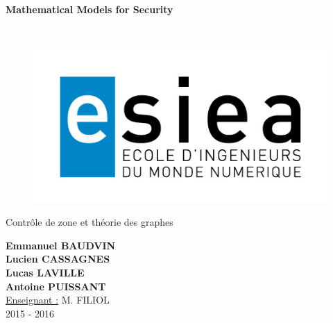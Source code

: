 \begin{titlepage}
      \begin{center}   
        \Huge
        \textbf{Mathematical Models for Security}
        
        \LARGE
        ~
        
        
        \vfill
        \begin{figure}[H]
	    \centering
	    \begin{minipage}{0.89\textwidth}
		\centering
		\includegraphics[width=\textwidth]{./img/esiea.jpeg}
	    \end{minipage}
	\end{figure}
        \vfill
        
        \vspace{0.5cm}
        
        Contrôle de zone et théorie des graphes
        
        \vspace{2cm}
        \textbf{Emmanuel BAUDVIN\\Lucien CASSAGNES\\Lucas LAVILLE\\Antoine PUISSANT}\\
        \vspace{0.8cm}
        \Large
        \underline{Enseignant :} M. FILIOL\\
        \vspace{0.5cm}
        2015 - 2016%
        
    \end{center}
\end{titlepage}
